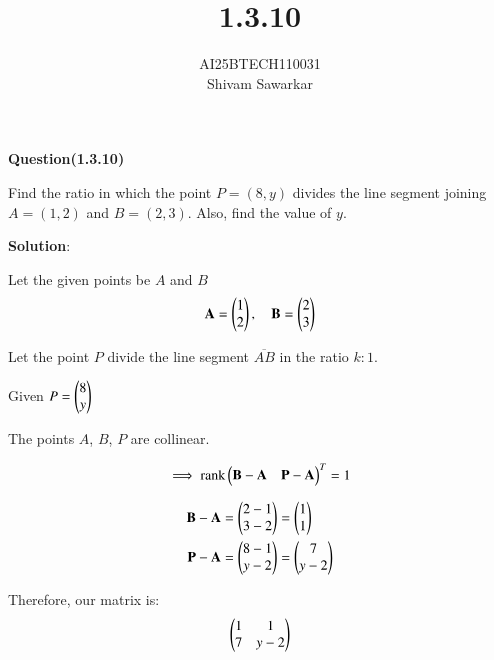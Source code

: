 \documentclass[journal]{IEEEtran}
\begin{document}

\vspace{3cm}

\title{1.3.10}
\author{AI25BTECH110031 \\ Shivam Sawarkar}
 \maketitle
{\let\newpage\relax\maketitle}

\renewcommand{\thefigure}{\theenumi}
\renewcommand{\thetable}{\theenumi}
\setlength{\intextsep}{10pt} %


\renewcommand{\thetable}{\theenumi}

\textbf{Question(1.3.10)}

Find the ratio in which the point $P = (8, y)$ divides the line segment joining
$A = (1, 2)$ and $B = (2, 3)$. Also, find the value of $y$.

\textbf{Solution}:

Let the given points be $A$ and $B$
\begin{align*}
\mathbf{A} = \begin{pmatrix}1 \\ 2\end{pmatrix}, \quad \mathbf{B} = \begin{pmatrix}2 \\ 3\end{pmatrix}
\end{align*}

Let the point $P$ divide the line segment $\overline{AB}$ in the ratio $k:1$.

Given $P = \begin{pmatrix}8 \\ y\end{pmatrix}$

The points $A$, $B$, $P$ are collinear.

\begin{align}
\implies \text{rank} \begin{pmatrix} \mathbf{B}-\mathbf{A} & \mathbf{P}-\mathbf{A} \end{pmatrix}^T = 1
\end{align}

\begin{align}
\mathbf{B}-\mathbf{A} &= \begin{pmatrix}2-1 \\ 3-2\end{pmatrix} = \begin{pmatrix}1 \\ 1\end{pmatrix} \\
\mathbf{P}-\mathbf{A} &= \begin{pmatrix}8-1 \\ y-2\end{pmatrix} = \begin{pmatrix}7 \\ y-2\end{pmatrix}
\end{align}

Therefore, our matrix is:
\begin{align}
\begin{pmatrix}
1 & 1 \\
7 & y-2
\end{pmatrix}
\end{align}
\end{document}
